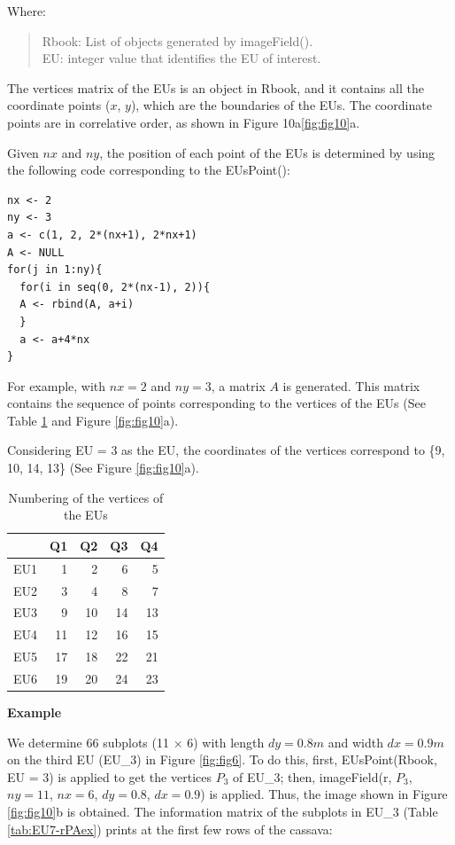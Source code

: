 Where:

\begin{quote}
Rbook: List of objects generated by imageField().\\
EU: integer value that identifies the EU of interest.
\end{quote}

The vertices matrix of the EUs is an object in Rbook, and it contains all the coordinate points (\(x\), \(y\)), which are the boundaries of the EUs. The coordinate points are in correlative order, as shown in Figure 10a\ref{fig:fig10}a.

Given \(nx\) and \(ny\), the position of each point of the EUs is determined by using the following code corresponding to the EUsPoint():

\begin{verbatim}
nx <- 2
ny <- 3
a <- c(1, 2, 2*(nx+1), 2*nx+1)
A <- NULL
for(j in 1:ny){ 
  for(i in seq(0, 2*(nx-1), 2)){
  A <- rbind(A, a+i)
  }
  a <- a+4*nx 
}
\end{verbatim}

For example, with \(nx = 2\) and \(ny = 3\), a matrix \(A\) is generated. This matrix contains the sequence of points corresponding to the vertices of the EUs (See Table \ref{tab:EU6-rPAex} and Figure \ref{fig:fig10}a).

Considering EU = 3 as the EU, the coordinates of the vertices correspond to \{9, 10, 14, 13\} (See Figure \ref{fig:fig10}a).

\begin{table}

\caption{\label{tab:EU6-rPAex}Numbering of the vertices of the EUs}
\centering
\begin{tabular}[t]{lrrrr}
\toprule
  & Q1 & Q2 & Q3 & Q4\\
\midrule
EU1 & 1 & 2 & 6 & 5\\
EU2 & 3 & 4 & 8 & 7\\
EU3 & 9 & 10 & 14 & 13\\
EU4 & 11 & 12 & 16 & 15\\
EU5 & 17 & 18 & 22 & 21\\
\addlinespace
EU6 & 19 & 20 & 24 & 23\\
\bottomrule
\end{tabular}
\end{table}

\textbf{Example}

We determine 66 subplots (11 \(\times\) 6) with length \(dy = 0.8 m\) and width \(dx = 0.9 m\) on the third EU (EU\_3) in Figure \ref{fig:fig6}. To do this, first, EUsPoint(Rbook, EU = 3) is applied to get the vertices \(P_3\) of EU\_3; then, imageField(r, \(P_3\), \(ny = 11\), \(nx = 6\), \(dy = 0.8\), \(dx = 0.9\)) is applied. Thus, the image shown in Figure \ref{fig:fig10}b is obtained. The information matrix of the subplots in EU\_3 (Table \ref{tab:EU7-rPAex}) prints at the first few rows of the cassava:

